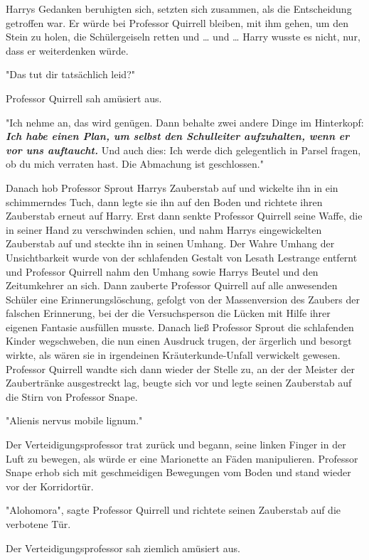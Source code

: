 {Harrys Gedanken beruhigten sich, setzten sich zusammen, als die Entscheidung getroffen war. Er würde bei Professor Quirrell bleiben, mit ihm gehen, um den Stein zu holen, die Schülergeiseln retten und … und … Harry wusste es nicht, nur, dass er weiterdenken würde.

"Das tut dir tatsächlich leid?"

Professor Quirrell sah amüsiert aus.

"Ich nehme an, das wird genügen. Dann behalte zwei andere Dinge im Hinterkopf: \textbf{\emph{Ich habe einen Plan, um selbst den Schulleiter aufzuhalten, wenn er vor uns auftaucht.}} Und auch dies: Ich werde dich gelegentlich in Parsel fragen, ob du mich verraten hast. Die Abmachung ist geschlossen."

Danach hob Professor Sprout Harrys Zauberstab auf und wickelte ihn in ein schimmerndes Tuch, dann legte sie ihn auf den Boden und richtete ihren Zauberstab erneut auf Harry. Erst dann senkte Professor Quirrell seine Waffe, die in seiner Hand zu verschwinden schien, und nahm Harrys eingewickelten Zauberstab auf und steckte ihn in seinen Umhang. Der Wahre Umhang der Unsichtbarkeit wurde von der schlafenden Gestalt von Lesath Lestrange entfernt und Professor Quirrell nahm den Umhang sowie Harrys Beutel und den Zeitumkehrer an sich. Dann zauberte Professor Quirrell auf alle anwesenden Schüler eine Erinnerungslöschung, gefolgt von der Massenversion des Zaubers der falschen Erinnerung, bei der die Versuchsperson die Lücken mit Hilfe ihrer eigenen Fantasie ausfüllen musste. Danach ließ Professor Sprout die schlafenden Kinder wegschweben, die nun einen Ausdruck trugen, der ärgerlich und besorgt wirkte, als wären sie in irgendeinen Kräuterkunde-Unfall verwickelt gewesen. Professor Quirrell wandte sich dann wieder der Stelle zu, an der der Meister der Zaubertränke ausgestreckt lag, beugte sich vor und legte seinen Zauberstab auf die Stirn von Professor Snape.

"Alienis nervus mobile lignum."

Der Verteidigungsprofessor trat zurück und begann, seine linken Finger in der Luft zu bewegen, als würde er eine Marionette an Fäden manipulieren. Professor Snape erhob sich mit geschmeidigen Bewegungen vom Boden und stand wieder vor der Korridortür.

"Alohomora", sagte Professor Quirrell und richtete seinen Zauberstab auf die verbotene Tür.

Der Verteidigungsprofessor sah ziemlich amüsiert aus.

}
